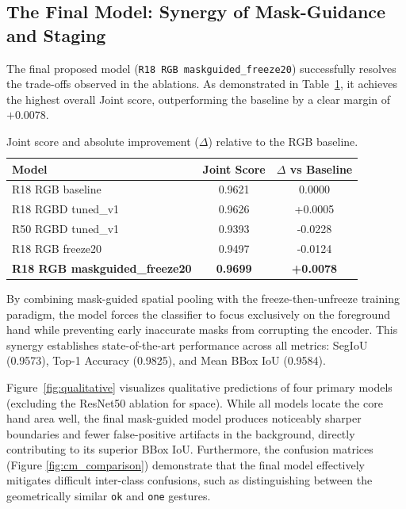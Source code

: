 \documentclass[conference]{IEEEtran}
\begin{document}
\subsection{The Final Model: Synergy of Mask-Guidance and Staging}
The final proposed model (\texttt{R18 RGB maskguided\_freeze20}) successfully resolves the trade-offs observed in the ablations. As demonstrated in Table~\ref{tab:joint_delta}, it achieves the highest overall Joint score, outperforming the baseline by a clear margin of $+0.0078$. 

\begin{table}[tb]
\centering
\caption{Joint score and absolute improvement ($\Delta$) relative to the RGB baseline.}
\label{tab:joint_delta}
\begin{tabular}{lcc}
\toprule
Model & Joint Score & $\Delta$ vs Baseline \\
\midrule
R18 RGB baseline & 0.9621 & 0.0000 \\
R18 RGBD tuned\_v1 & 0.9626 & +0.0005 \\
R50 RGBD tuned\_v1 & 0.9393 & -0.0228 \\
R18 RGB freeze20 & 0.9497 & -0.0124 \\
\textbf{R18 RGB maskguided\_freeze20} & \textbf{0.9699} & \textbf{+0.0078} \\
\bottomrule
\end{tabular}
\end{table}

By combining mask-guided spatial pooling with the freeze-then-unfreeze training paradigm, the model forces the classifier to focus exclusively on the foreground hand while preventing early inaccurate masks from corrupting the encoder. This synergy establishes state-of-the-art performance across all metrics: SegIoU (0.9573), Top-1 Accuracy (0.9825), and Mean BBox IoU (0.9584).

Figure~\ref{fig:qualitative} visualizes qualitative predictions of four primary models (excluding the ResNet50 ablation for space). While all models locate the core hand area well, the final mask-guided model produces noticeably sharper boundaries and fewer false-positive artifacts in the background, directly contributing to its superior BBox IoU. Furthermore, the confusion matrices (Figure \ref{fig:cm_comparison}) demonstrate that the final model effectively mitigates difficult inter-class confusions, such as distinguishing between the geometrically similar \texttt{ok} and \texttt{one} gestures.
\end{document}
